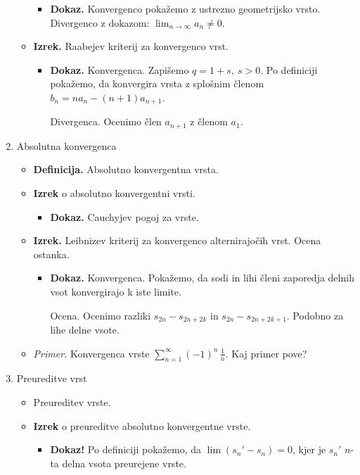\begin{enumerate}
\begin{itemize}
        \begin{itemize}
            \item \colorbox{green!30}{\textbf{Dokaz.}} Konvergenco pokažemo z ustrezno geometrijsko vrsto. Divergenco z dokazom: $\lim_{n \to \infty}a_n \neq 0$.
        \end{itemize}
        \item \colorbox{blue!30}{\textbf{Izrek.}} Raabejev kriterij za konvergenco vrst.
        \begin{itemize}
            \item \colorbox{green!30}{\textbf{Dokaz.}} Konvergenca. Zapišemo $q = 1+s, \ s>0$. Po definiciji pokažemo, da konvergira vrsta z splošnim členom $b_n = na_n - (n+1)a_{n+1}$.
            
            Divergenca. Ocenimo člen $a_{n+1}$ z členom $a_1$.
        \end{itemize}
    \end{itemize}

    \item Absolutna konvergenca        
    \begin{itemize}
        \item  \colorbox{purple!30}{\textbf{Definicija.}} Absolutno konvergentna vrsta.
        \item \colorbox{blue!30}{\textbf{Izrek}} o absolutno konvergentni vrsti.
        \begin{itemize}
            \item \colorbox{green!30}{\textbf{Dokaz.}} Cauchyjev pogoj za vrste.
        \end{itemize}
        \item \colorbox{blue!30}{\textbf{Izrek.}} Leibnizev kriterij za konvergenco alternirajočih vrst. Ocena ostanka.
        \begin{itemize}
            \item \colorbox{green!30}{\textbf{Dokaz.}} Konvergenca. Pokažemo, da sodi in lihi členi zaporedja delnih vsot konvergirajo k iste limite.
            
            Ocena. Ocenimo razliki $s_{2n} - s_{2n+2k}$ in $s_{2n} - s_{2n+2k + 1}$. Podobno za lihe delne vsote.
        \end{itemize}
        \item \colorbox{yellow!30}{\emph{Primer.}} Konvergenca vrste $\sum_{n = 1}^{\infty} (-1)^n \, \frac{1}{n}$. Kaj primer pove?
    \end{itemize}

    \item Preureditve vrst
    \begin{itemize}
        \item Preureditev vrste.            
        \item \colorbox{blue!30}{\textbf{Izrek}} o preureditve absolutno konvergentne vrste.         
        \begin{itemize}
            \item \colorbox{green!50}{\textbf{Dokaz!}} Po definiciji pokažemo, da $\lim(s_n' - s_n) = 0$, kjer je $s_n'$ $n$-ta delna vsota preurejene vrste. 
            

\end{itemize}
\end{itemize}
\end{enumerate}
